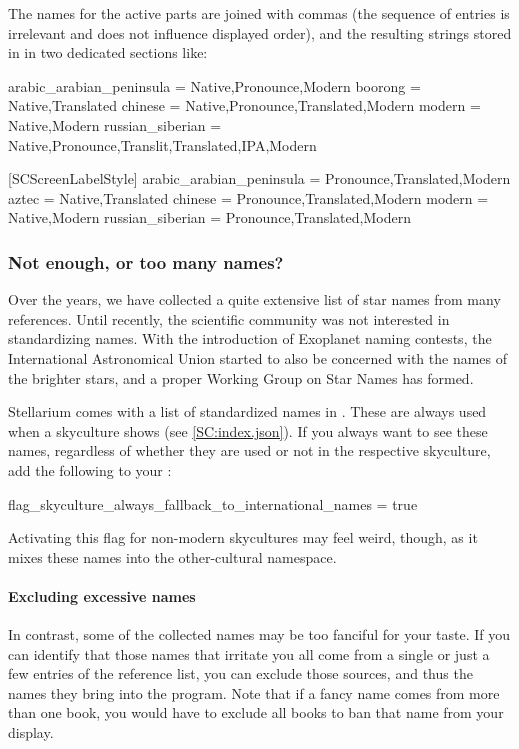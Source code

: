 The names for the active parts are joined with commas (the sequence of entries is irrelevant and does not influence displayed order), 
and the resulting strings stored in  in two dedicated sections like: 
\begin{configfile}[\scriptsize]
[SCInfoLabelStyle]
arabic_arabian_peninsula  = Native,Pronounce,Modern
boorong                   = Native,Translated
chinese                   = Native,Pronounce,Translated,Modern
modern                    = Native,Modern
russian_siberian          = Native,Pronounce,Translit,Translated,IPA,Modern

[SCScreenLabelStyle]
arabic_arabian_peninsula  = Pronounce,Translated,Modern
aztec                     = Native,Translated
chinese                   = Pronounce,Translated,Modern
modern                    = Native,Modern
russian_siberian          = Pronounce,Translated,Modern
\end{configfile}



\subsubsection{Not enough, or too many names?}
\label{sec:skycultures:fallback_names}
Over the years, we have collected a quite extensive list of star names from many references. 
Until recently, the scientific community was not interested in standardizing names. 
With the introduction of Exoplanet naming contests, the International Astronomical Union started 
to also be concerned with the names of the brighter stars, and a proper Working Group on Star Names has formed. 

Stellarium comes with a list of standardized names in . 
These are always used when a skyculture shows  (see \ref{SC:index.json}).
If you always want to see these names, regardless of whether they are used or not in the respective skyculture, add the following to your :
\begin{configfile}
[viewing]
flag_skyculture_always_fallback_to_international_names = true
\end{configfile}
Activating this flag for non-modern skycultures may feel weird, though, as it mixes these names into the other-cultural namespace.

\paragraph{Excluding excessive names}
\label{sec:skycultures:exclude_references}
In contrast, some of the collected names may be too fanciful for your taste. 
If you can identify that those names that irritate you all come from a single or just a few entries of the reference list, 
you can exclude those sources, and thus the names they bring into the program. Note that if a fancy name comes from more than one book, 
you would have to exclude all books to ban that name from your display.

